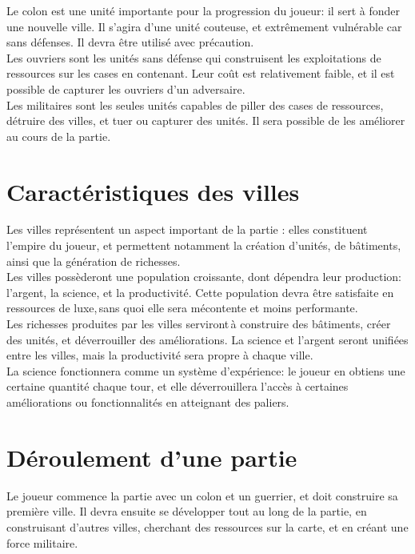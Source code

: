 \documentclass[12pt]{report}
\begin{document}
Le colon est une unité importante pour la progression du joueur: il sert à fonder une nouvelle ville. Il s'agira d'une unité couteuse, et extrêmement vulnérable car sans défenses. Il devra être utilisé avec précaution.\\

Les ouvriers sont les unités sans défense qui construisent les exploitations de ressources sur les cases en contenant. Leur coût est relativement faible, et il est possible de capturer les ouvriers d'un adversaire.\\

Les militaires sont les seules unités capables de piller des cases de ressources, détruire des villes, et tuer ou capturer des unités. Il sera possible de les améliorer au cours de la partie.

\section{Caractéristiques des villes}

Les villes représentent un aspect important de la partie : elles constituent l'empire du joueur, et permettent notamment la création d'unités, de bâtiments, ainsi que la génération de richesses. \\

Les villes possèderont une population croissante, dont dépendra leur production: l'argent, la science, et la productivité. Cette population devra être satisfaite en ressources de luxe, sans quoi elle sera mécontente et moins performante.\\

Les richesses produites par les villes serviront à construire des bâtiments, créer des unités, et déverrouiller des améliorations. La science et l'argent seront unifiées entre les villes, mais la productivité sera propre à chaque ville.\\

La science fonctionnera comme un système d'expérience: le joueur en obtiens une certaine quantité chaque tour, et elle déverrouillera l'accès à certaines améliorations ou fonctionnalités en atteignant des paliers.

\section{Déroulement d'une partie}

Le joueur commence la partie avec un colon et un guerrier, et doit construire sa première ville. Il devra ensuite se développer tout au long de la partie, en construisant d'autres villes, cherchant des ressources sur la carte, et en créant une force militaire.\\
\end{document}
